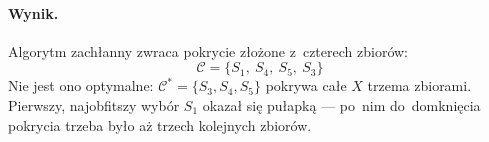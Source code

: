 \paragraph{Wynik.}
Algorytm zachłanny zwraca pokrycie złożone z~czterech zbiorów:
\[
	\boxed{\mathcal{C} = \{S_1,\ S_4,\ S_5,\ S_3\}}
\]
Nie jest ono optymalne: $\mathcal{C}^* = \{S_3, S_4, S_5\}$ pokrywa całe $X$
trzema zbiorami. Pierwszy, najobfitszy wybór $S_1$ okazał się pułapką --- po~nim
do~domknięcia pokrycia trzeba było aż trzech kolejnych zbiorów.
